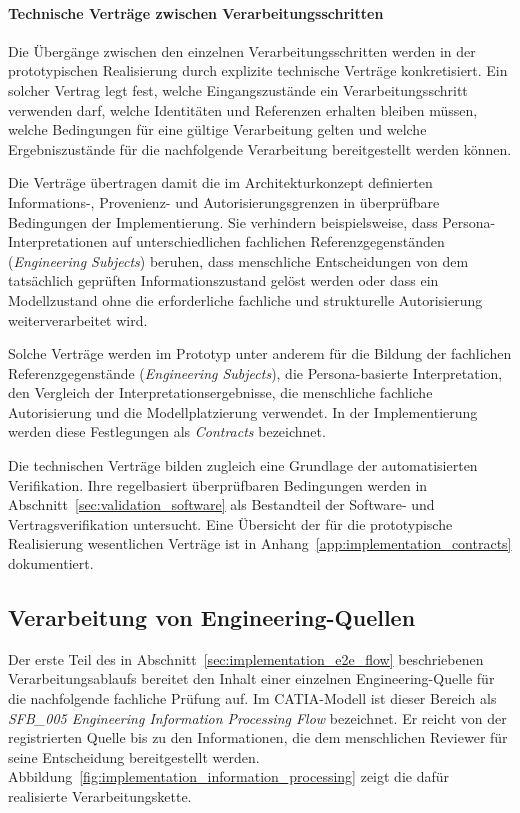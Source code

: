 \paragraph{Technische Verträge zwischen Verarbeitungsschritten}

Die Übergänge zwischen den einzelnen Verarbeitungsschritten werden in der
prototypischen Realisierung durch explizite technische Verträge
konkretisiert. Ein solcher Vertrag legt fest, welche Eingangszustände ein
Verarbeitungsschritt verwenden darf, welche Identitäten und Referenzen
erhalten bleiben müssen, welche Bedingungen für eine gültige Verarbeitung
gelten und welche Ergebniszustände für die nachfolgende Verarbeitung
bereitgestellt werden können.

Die Verträge übertragen damit die im Architekturkonzept definierten
Informations-, Provenienz- und Autorisierungsgrenzen in überprüfbare
Bedingungen der Implementierung. Sie verhindern beispielsweise, dass
Persona-Interpretationen auf unterschiedlichen fachlichen
Referenzgegenständen (\emph{Engineering Subjects}) beruhen, dass menschliche
Entscheidungen von dem tatsächlich geprüften Informationszustand gelöst
werden oder dass ein Modellzustand ohne die erforderliche fachliche und
strukturelle Autorisierung weiterverarbeitet wird.

Solche Verträge werden im Prototyp unter anderem für die Bildung der
fachlichen Referenzgegenstände (\emph{Engineering Subjects}), die
Persona-basierte Interpretation, den Vergleich der
Interpretationsergebnisse, die menschliche fachliche Autorisierung und die
Modellplatzierung verwendet. In der Implementierung werden diese
Festlegungen als \emph{Contracts} bezeichnet.

Die technischen Verträge bilden zugleich eine Grundlage der automatisierten
Verifikation. Ihre regelbasiert überprüfbaren Bedingungen werden in
Abschnitt~\ref{sec:validation_software} als Bestandteil der Software- und
Vertragsverifikation untersucht. Eine Übersicht der für die prototypische
Realisierung wesentlichen Verträge ist in
Anhang~\ref{app:implementation_contracts} dokumentiert.

\subsection{Verarbeitung von Engineering-Quellen}
\label{sec:implementation_information_processing}

Der erste Teil des in
Abschnitt~\ref{sec:implementation_e2e_flow} beschriebenen
Verarbeitungsablaufs bereitet den Inhalt einer einzelnen Engineering-Quelle
für die nachfolgende fachliche Prüfung auf. Im CATIA-Modell ist dieser
Bereich als \emph{SFB\_005 Engineering Information Processing Flow}
bezeichnet. Er reicht von der registrierten Quelle bis zu den Informationen,
die dem menschlichen Reviewer für seine Entscheidung bereitgestellt werden.
Abbildung~\ref{fig:implementation_information_processing} zeigt die dafür
realisierte Verarbeitungskette.

